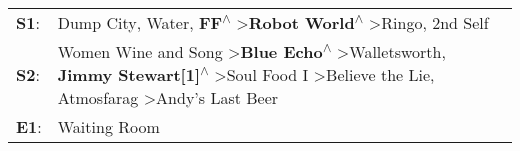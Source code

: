 \begin{supertabular}{p{0.03\textwidth}p{0.92\textwidth}}
 \textbf{S1}:  &                                                                                                                                                                    Dump City\textsuperscript{}, \enspace Water\textsuperscript{}, \enspace \textbf{FF\textsuperscript{$\wedge$}} \textgreater \enspace \textbf{Robot World\textsuperscript{$\wedge$}} \textgreater \enspace Ringo\textsuperscript{}, \enspace 2nd Self\textsuperscript{}  \enspace  \\
 \textbf{S2}:  &  Women Wine and Song\textsuperscript{} \textgreater \enspace \textbf{Blue Echo\textsuperscript{$\wedge$}} \textgreater \enspace Walletsworth\textsuperscript{}, \enspace \textbf{Jimmy Stewart[1]\textsuperscript{$\wedge$}} \textgreater \enspace Soul Food I\textsuperscript{} \textgreater \enspace Believe the Lie\textsuperscript{}, \enspace Atmosfarag\textsuperscript{} \textgreater \enspace Andy's Last Beer\textsuperscript{}  \enspace  \\
 \textbf{E1}:  &                                                                                                                                                                                                                                                                                                                                                                                                           Waiting Room\textsuperscript{}  \enspace  \\
\end{supertabular}
